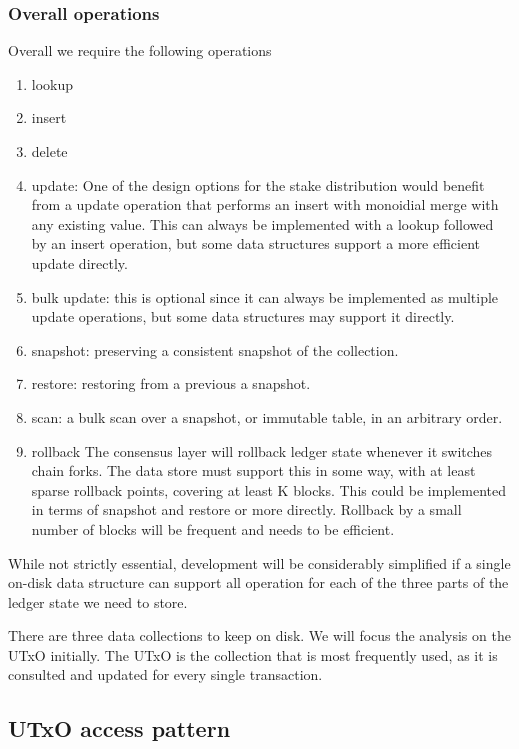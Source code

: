 \documentclass[11pt,a4paper]{article}
\begin{document}
\subsubsection{Overall operations}
\label{overall-operations}

Overall we require the following operations
\begin{enumerate}
  \item {\sc lookup}
  \item {\sc insert}
  \item {\sc delete}
  \item {\sc update}: One of the design options for the stake distribution
        would benefit from a update operation that performs an insert with
        monoidial merge with any existing value. This can always be implemented
        with a {\sc lookup} followed by an {\sc insert} operation, but some
        data structures support a more efficient {\sc update} directly.
  \item {\sc bulk update}: this is optional since it can always be implemented
        as multiple {\sc update} operations, but some data structures may
        support it directly.
  \item {\sc snapshot}: preserving a consistent snapshot of the collection.
  \item {\sc restore}: restoring from a previous a snapshot.
  \item {\sc scan}: a bulk scan over a snapshot, or immutable table, in an
        arbitrary order.
  \item {\sc rollback}
        The consensus layer will rollback ledger state whenever it switches
        chain forks. The data store must support this in some way, with at
        least sparse rollback points, covering at least K blocks. This could
        be implemented in terms of {\sc snapshot} and {\sc restore} or more
        directly. Rollback by a small number of blocks will be frequent and
        needs to be efficient.
\end{enumerate}
While not strictly essential, development will be considerably simplified if
a single on-disk data structure can support all operation for each of the
three parts of the ledger state we need to store.

There are three data collections to keep on disk. We will focus the analysis on
the UTxO initially. The UTxO is the collection that is most frequently used, as
it is consulted and updated for every single transaction.

\subsection{UTxO access pattern}
\label{utxo-access-pattern}
\end{document}
